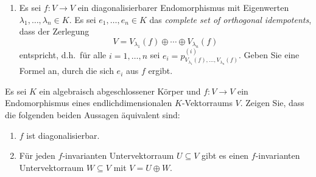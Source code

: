 \begin{question}
\begin{enumerate}[leftmargin=*]
\begin{align*}
\begin{tabular}{c}
            ist ein \emph{complete set}     \\
            \emph{of orthogonal}            \\
            \emph{idempotents}
          \end{tabular}
        \right\}
        \\
        (U_1, \dotsc, U_n)
        &\longmapsto
        \left( p^{(1)}_{U_1, \dotsc, U_n}, \dotsc, p^{(n)}_{U_1, \dotsc, U_n} \right)
        \\
        (\im e_1, \dotsc, \im e_n)
        &\longmapsfrom
        (e_1, \dotsc, e_n)
      \end{align*}
    \item
      Es sei $f \colon V \to V$ ein diagonalisierbarer Endomorphismus mit Eigenwerten $\lambda_1, \dotsc, \lambda_n \in K$.
      Es sei $e_1, \dotsc, e_n \in K$ das \emph{complete set of orthogonal idempotents}, dass der Zerlegung
      \[
        V = V_{\lambda_1}(f) \oplus \dotsb \oplus V_{\lambda_n}(f)
      \]
      entspricht, d.h.\ für alle $i = 1, \dotsc, n$ sei $e_i = p^{(i)}_{V_{\lambda_1}(f), \dots, V_{\lambda_n}(f)}$.
      Geben Sie eine Formel an, durch die sich $e_i$ aus $f$ ergibt.
  \end{enumerate}
\end{question}


\begin{question}
  Es sei $K$ ein algebraisch abgeschlossener Körper und $f \colon V \to V$ ein Endomorphismus eines endlichdimensionalen $K$-Vektorraums $V$.
  Zeigen Sie, dass die folgenden beiden Aussagen äquivalent sind:
  \begin{enumerate}
    \item
      $f$ ist diagonalisierbar.
    \item
      Für jeden $f$-invarianten Untervektorraum $U \subseteq V$ gibt es einen $f$-invarianten Untervektorraum $W \subseteq V$ mit $V = U \oplus W$.
  \end{enumerate}
\end{question}


